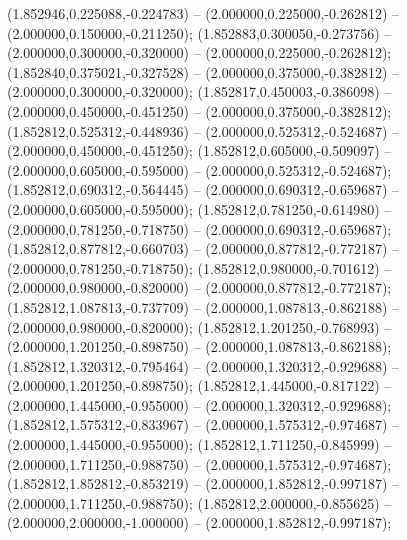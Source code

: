  (1.852946,0.225088,-0.224783) -- (2.000000,0.225000,-0.262812) -- (2.000000,0.150000,-0.211250);
 (1.852883,0.300050,-0.273756) -- (2.000000,0.300000,-0.320000) -- (2.000000,0.225000,-0.262812);
 (1.852840,0.375021,-0.327528) -- (2.000000,0.375000,-0.382812) -- (2.000000,0.300000,-0.320000);
 (1.852817,0.450003,-0.386098) -- (2.000000,0.450000,-0.451250) -- (2.000000,0.375000,-0.382812);
 (1.852812,0.525312,-0.448936) -- (2.000000,0.525312,-0.524687) -- (2.000000,0.450000,-0.451250);
 (1.852812,0.605000,-0.509097) -- (2.000000,0.605000,-0.595000) -- (2.000000,0.525312,-0.524687);
 (1.852812,0.690312,-0.564445) -- (2.000000,0.690312,-0.659687) -- (2.000000,0.605000,-0.595000);
 (1.852812,0.781250,-0.614980) -- (2.000000,0.781250,-0.718750) -- (2.000000,0.690312,-0.659687);
 (1.852812,0.877812,-0.660703) -- (2.000000,0.877812,-0.772187) -- (2.000000,0.781250,-0.718750);
 (1.852812,0.980000,-0.701612) -- (2.000000,0.980000,-0.820000) -- (2.000000,0.877812,-0.772187);
 (1.852812,1.087813,-0.737709) -- (2.000000,1.087813,-0.862188) -- (2.000000,0.980000,-0.820000);
 (1.852812,1.201250,-0.768993) -- (2.000000,1.201250,-0.898750) -- (2.000000,1.087813,-0.862188);
 (1.852812,1.320312,-0.795464) -- (2.000000,1.320312,-0.929688) -- (2.000000,1.201250,-0.898750);
 (1.852812,1.445000,-0.817122) -- (2.000000,1.445000,-0.955000) -- (2.000000,1.320312,-0.929688);
 (1.852812,1.575312,-0.833967) -- (2.000000,1.575312,-0.974687) -- (2.000000,1.445000,-0.955000);
 (1.852812,1.711250,-0.845999) -- (2.000000,1.711250,-0.988750) -- (2.000000,1.575312,-0.974687);
 (1.852812,1.852812,-0.853219) -- (2.000000,1.852812,-0.997187) -- (2.000000,1.711250,-0.988750);
 (1.852812,2.000000,-0.855625) -- (2.000000,2.000000,-1.000000) -- (2.000000,1.852812,-0.997187);
